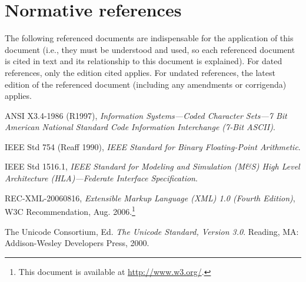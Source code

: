 \newpage


\section{Normative references}
The following referenced documents are indispensable for the application of this document (i.e., they must be understood and used, so each referenced document is cited in text and its relationship to this document is explained). For dated references, only the edition cited applies. For undated references, the latest edition of the referenced document (including any amendments or corrigenda) applies.

ANSI X3.4-1986 (R1997), \textit{Information Systems---Coded Character Sets---7 Bit American National Standard Code Information Interchange (7-Bit ASCII)}.

IEEE Std 754 (Reaff 1990), \textit{IEEE Standard for Binary Floating-Point Arithmetic}.

IEEE Std 1516.1, \textit{IEEE Standard for Modeling and Simulation (M\&S) High Level Architecture (HLA)---Federate Interface Specification}.

REC-XML-20060816, \textit{Extensible Markup Language (XML) 1.0 (Fourth Edition)}, W3C Recommendation, Aug. 2006.\footnote{This document is available at \url{http://www.w3.org/}.}

The Unicode Consortium, Ed. \textit{The Unicode Standard, Version 3.0}. Reading, MA: Addison-Wesley Developers Press, 2000.
